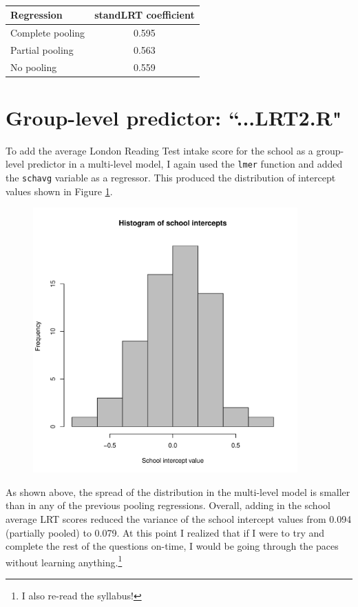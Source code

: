 \documentclass{article}
\begin{document}
\begin{table}[H]
\centering
\caption{}
\label{standLRT}
\begin{tabular}{@{}  l c @{}}
\textbf{Regression} & \textbf{standLRT coefficient} \\\midrule
Complete pooling &  0.595\\
Partial pooling & 0.563\\ 
No pooling & 0.559\\ 
\bottomrule
\hline
\end{tabular}
\end{table}

\section{Group-level predictor: ``...LRT2.R"}
To add the average London Reading Test intake score for the school as a group-level predictor in a multi-level model, I again used the \verb|lmer| function and added the \verb|schavg| variable as a regressor. This produced the distribution of intercept values shown in Figure \ref{groupie}.

\begin{figure}[H]
\centering
\includegraphics[width = 4in]{figures/group_level.pdf}
\caption{}
\label{groupie}
\end{figure}

As shown above, the spread of the distribution in the multi-level model is smaller than in any of the previous pooling regressions. Overall, adding in the school average LRT scores reduced the variance of the school intercept values from 0.094 (partially pooled) to 0.079. At this point I realized that if I were to try and complete the rest of the questions on-time, I would be going through the paces without learning anything.\footnote{I also re-read the syllabus!}
\end{document}
